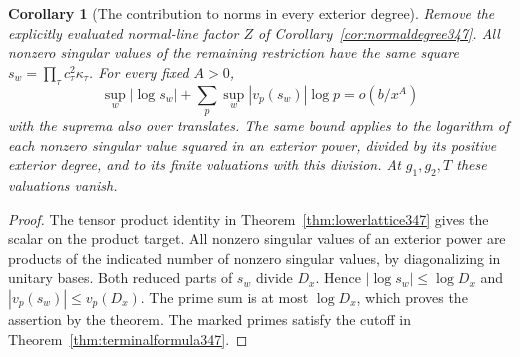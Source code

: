 \documentclass[a4paper,11pt]{article}
\newtheorem{corollary}[proposition]{Corollary}
\theoremstyle{definition}
\theoremstyle{remark}
\numberwithin{equation}{section}
\begin{document}
\begin{corollary}[The contribution to norms in every exterior degree]\leavevmode
\label{cor:singular349}
Remove the explicitly evaluated normal-line factor \(Z\) of
Corollary~\ref{cor:normaldegree347}. All nonzero singular values
of the remaining restriction have the same square
\(s_w=\prod_\tau c_\tau^2\kappa_\tau\). For every fixed \(A>0\),
\[
       \sup_w|\log s_w|+\sum_p\sup_w |v_p(s_w)|\log p
                         =o(b/x^A)
\]
with the suprema also over translates. The same bound applies
to the logarithm of each nonzero singular value squared in an
exterior power, divided by its positive exterior degree, and
to its finite valuations with this division. At \(g_1,g_2,T\)
these valuations vanish.
\end{corollary}
\begin{proof}
The tensor product identity in Theorem~\ref{thm:lowerlattice347}
gives the scalar on the product target. All nonzero singular
values of an exterior power are products of the indicated number
of nonzero singular values, by diagonalizing in unitary bases.
Both reduced parts of \(s_w\) divide \(D_x\).
Hence \(|\log s_w|\le\log D_x\) and
\(|v_p(s_w)|\le v_p(D_x)\). The prime sum is at most
\(\log D_x\), which proves the assertion by the theorem.
The marked primes satisfy the cutoff in
Theorem~\ref{thm:terminalformula347}.
\end{proof}
\end{document}
